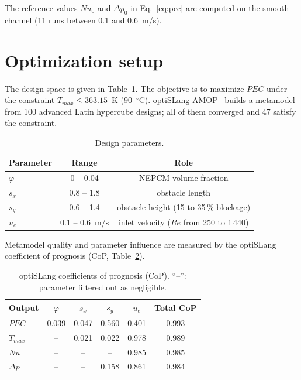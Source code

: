 \documentclass[11pt,a4paper]{article}
\begin{document}
The reference values $Nu_0$ and $\Delta p_0$ in Eq.~\eqref{eq:pec} are computed on the smooth channel (11 runs between 0.1 and 0.6~m/s).

\section{Optimization setup}
The design space is given in Table~\ref{tab:doe}. The objective is to maximize $PEC$ under the constraint $T_{max} \le 363.15$~K (90~$^\circ$C). optiSLang AMOP~\cite{most2008} builds a metamodel from 100 advanced Latin hypercube designs; all of them converged and 47 satisfy the constraint.

\begin{table}[H]
\centering
\caption{Design parameters.}
\label{tab:doe}
\begin{tabular}{lcc}
\toprule
Parameter & Range & Role \\
\midrule
$\varphi$ & 0 -- 0.04 & NEPCM volume fraction \\
$s_x$ & 0.8 -- 1.8 & obstacle length \\
$s_y$ & 0.6 -- 1.4 & obstacle height (15 to 35\,\% blockage) \\
$u_e$ & 0.1 -- 0.6~m/s & inlet velocity ($Re$ from 250 to 1\,440) \\
\bottomrule
\end{tabular}
\end{table}

Metamodel quality and parameter influence are measured by the optiSLang coefficient of prognosis (CoP, Table~\ref{tab:cop}).

\begin{table}[H]
\centering
\caption{optiSLang coefficients of prognosis (CoP). ``--'': parameter filtered out as negligible.}
\label{tab:cop}
\begin{tabular}{lccccc}
\toprule
Output & $\varphi$ & $s_x$ & $s_y$ & $u_e$ & Total CoP \\
\midrule
$PEC$ & 0.039 & 0.047 & 0.560 & 0.401 & 0.993 \\
$T_{max}$ & -- & 0.021 & 0.022 & 0.978 & 0.989 \\
$Nu$ & -- & -- & -- & 0.985 & 0.985 \\
$\Delta p$ & -- & -- & 0.158 & 0.861 & 0.984 \\
\bottomrule
\end{tabular}
\end{table}
\end{document}
